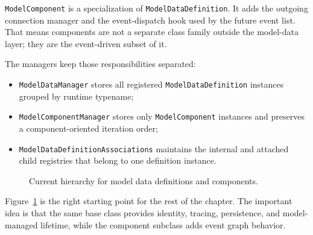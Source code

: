 \texttt{ModelComponent} is a specialization of \texttt{ModelDataDefinition}. It adds the
outgoing connection manager and the event-dispatch hook used by the future
event list. That means components are not a separate class family outside the
model-data layer; they are the event-driven subset of it.

The managers keep those responsibilities separated:
\begin{itemize}
\item \texttt{ModelDataManager} stores all registered \texttt{ModelDataDefinition} instances
      grouped by runtime typename;
\item \texttt{ModelComponentManager} stores only \texttt{ModelComponent} instances and
      preserves a component-oriented iteration order;
\item \texttt{ModelDataDefinitionAssociations} maintains the internal and attached
      child registries that belong to one definition instance.
\end{itemize}

\begin{figure}[htbp]
\centering
\caption{Current hierarchy for model data definitions and components.}
\label{fig:model-component-hierarchy}
\end{figure}

Figure~\ref{fig:model-component-hierarchy} is the right starting point for the
rest of the chapter. The important idea is that the same base class provides
identity, tracing, persistence, and model-managed lifetime, while the component
subclass adds event graph behavior.

